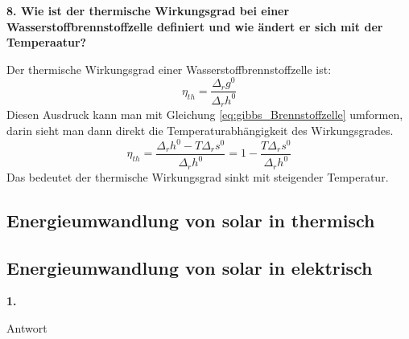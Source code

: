 \noindent\textbf{8. Wie ist der thermische Wirkungsgrad bei einer Wasserstoffbrennstoffzelle definiert und wie ändert er sich mit der Temperaatur?}\\
\begin{addmargin}[25pt]{0pt}
Der thermische Wirkungsgrad einer Wasserstoffbrennstoffzelle ist:
\begin{equation}\label{eq:thermischer_Wirkungsgrad_Brennstoffzelle}
    \eta_{th} = \frac{\Delta_rg^0}{\Delta_rh^0} 
\end{equation}
Diesen Ausdruck kann man mit Gleichung \ref{eq:gibbs_Brennstoffzelle} umformen, darin sieht man dann direkt die Temperaturabhängigkeit des Wirkungsgrades.
\begin{equation}
    \eta_{th} = \frac{\Delta_rh^0 - T\Delta_rs^0}{\Delta_rh^0} = 1- \frac{T\Delta_rs^0}{\Delta_rh^0}
\end{equation}
Das bedeutet der thermische Wirkungsgrad sinkt mit steigender Temperatur.
\end{addmargin}




\subsection{Energieumwandlung von solar in thermisch}
\subsection{Energieumwandlung von solar in elektrisch}

\noindent\textbf{1.}\\
\begin{addmargin}[25pt]{0pt}
Antwort\\
\end{addmargin}